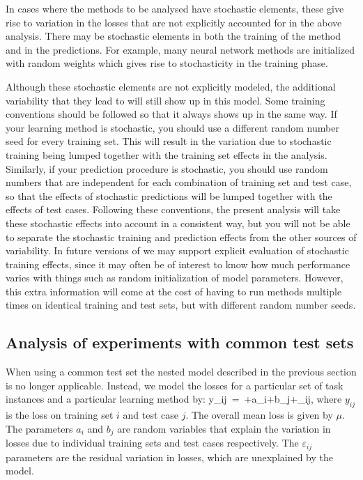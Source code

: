 In cases where the methods to be analysed have stochastic elements,
these give rise to variation in the losses that are not explicitly
accounted for in the above analysis. There may be stochastic elements
in both the training of the method and in the predictions. For
example, many neural network methods are initialized with random
weights which gives rise to stochasticity in the training phase.

Although these stochastic elements are not explicitly modeled, the
additional variability that they lead to will still show up in this
model. Some training conventions should be followed so that it always
shows up in the same way.  If your learning method is stochastic, you
should use a different random number seed for every training set. This
will result in the variation due to stochastic training being lumped
together with the training set effects in the analysis. Similarly, if
your prediction procedure is stochastic, you should use random numbers
that are independent for each combination of training set and test
case, so that the effects of stochastic predictions will be lumped
together with the effects of test cases.  Following these conventions,
the present analysis will take these stochastic effects into account
in a consistent way, but you will not be able to separate the
stochastic training and prediction effects from the other sources of
variability. In future versions of \delve{} we may support explicit
evaluation of stochastic training effects, since it may often be of
interest to know how much performance varies with things such as
random initialization of model parameters.  However, this extra
information will come at the cost of having to run methods multiple
times on identical training and test sets, but with different random
number seeds.

\subsection{Analysis of experiments with common test sets}

When using a common test set the nested model described in the
previous section is no longer applicable. Instead, we model the losses
for a particular set of task instances and a particular learning
method by:
\beq
y_{ij}\ =\ \mu+a_i+b_j+\varepsilon_{ij},
\label{eq-loss-model-c}
\eeq
where $y_{ij}$ is the loss on training set $i$ and test case $j$.
The overall mean loss is given by $\mu$. The parameters $a_i$ and
$b_j$ are random variables that explain the variation in losses due to
individual training sets and test cases respectively. The
$\varepsilon_{ij}$ parameters are the residual variation in losses,
which are unexplained by the model.

